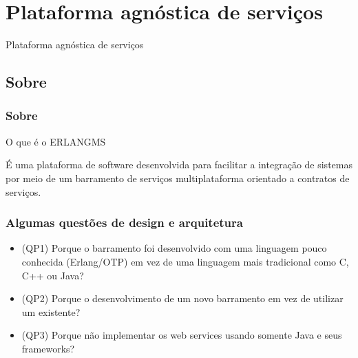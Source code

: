 \documentclass{beamer}
\begin{document}


\section{Plataforma agnóstica de serviços}


\begin{frame}[c]{ }
\centering
  \huge{Plataforma agnóstica de serviços}
\end{frame}



\subsection{Sobre}


\begin{frame}
  \frametitle{Sobre}

  \begin{exampleblock}{O que é o ERLANGMS}
  
É uma plataforma de software desenvolvida para facilitar a integração de sistemas por meio de um barramento 
de serviços multiplataforma orientado a contratos de serviços.

  \end{exampleblock}

  
\end{frame}






\begin{frame}
  \frametitle{Algumas questões de design e arquitetura}

  \begin{exampleblock}{}
  
	  \begin{itemize}
		\item<1->(QP1) Porque o barramento foi desenvolvido com 
		uma linguagem pouco conhecida (Erlang/OTP) em vez de uma linguagem mais tradicional como C, C++ ou Java?
	    \item<1->(QP2) Porque o desenvolvimento de um novo barramento em vez de utilizar um existente?
	    \item<1->(QP3) Porque não implementar os web services usando somente Java e seus frameworks?
	  \end{itemize}
  
  \end{exampleblock}

  
\end{frame}
\end{document}
